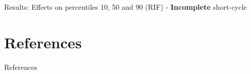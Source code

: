 \documentclass[11pt, aspectratio=169]{beamer}
\begin{document}
\begin{frame}{Results: Effects on percentiles 10, 50 and 90 (RIF) - \textbf{Incomplete} short-cycle}
    \centering
\end{frame}


\section*{References}
\begin{frame}[allowframebreaks]{References}

\tiny
\end{frame}
\end{document}
